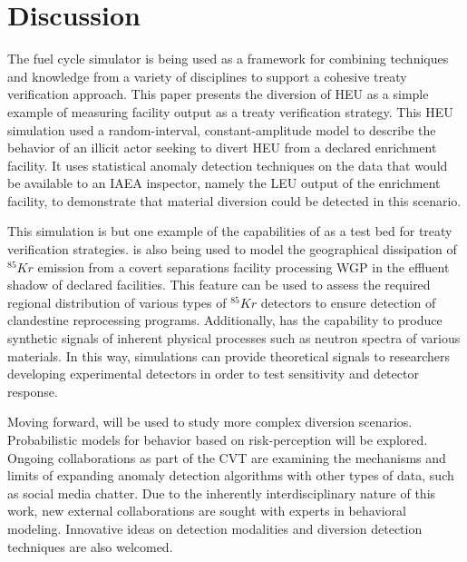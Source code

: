 \section{Discussion}
\label{s_dis}

The \Cyclus fuel cycle simulator is being used as a framework for combining techniques and knowledge from a variety of disciplines to support a cohesive treaty verification approach. This paper presents the diversion of \gls{HEU} as a simple example of measuring facility output as a treaty verification strategy.  This \gls{HEU} simulation used a random-interval, constant-amplitude model to describe the behavior of an illicit actor seeking to divert \gls{HEU} from a declared enrichment facility.  It uses statistical anomaly detection techniques on the data that would be available to an \gls{IAEA} inspector, namely the \gls{LEU} output of the enrichment facility, to demonstrate that material diversion could be detected in this scenario.

This simulation is but one example of the capabilities of \Cyclus as a test bed for treaty verification strategies.  \Cyclus is also being used to model the geographical dissipation of $^{85}Kr$ emission from a covert separations facility processing \gls{WGP} in the effluent shadow of declared facilities.  This feature can be used to assess the required regional distribution of various types of $^{85}Kr$ detectors to ensure detection of clandestine reprocessing programs.  Additionally, \Cyclus has the capability to produce synthetic signals of inherent physical processes such as neutron spectra of various materials.  In this way, \Cyclus simulations can provide theoretical signals to researchers developing experimental detectors in order to test sensitivity and detector response.

Moving forward, \Cyclus will be used to study more complex diversion scenarios.  Probabilistic models for behavior based on risk-perception will be explored.  Ongoing collaborations as part of the \gls{CVT} are examining the mechanisms and limits of expanding anomaly detection algorithms with other types of data, such as social media chatter.  Due to the inherently interdisciplinary nature of this work, new external collaborations are sought with experts in behavioral modeling. Innovative ideas on detection modalities and diversion detection techniques are also welcomed.



\textit{}
